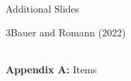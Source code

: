 \documentclass[xcolor=table,9pt,aspectratio=169]{beamer}
\begin{document}
\begin{frame}
\begin{overlayarea}{\textwidth}{0.81\paperheight}{
   \vspace*{11mm}
   \textcolor{uolblue}
   {\hspace*{1em}Additional Slides}
}
\end{overlayarea}
\end{frame}


\begin{frame}{\vspace*{10mm}3\hspace*{1em}Bauer and Romann (2022)}
\vspace*{-5mm}
\begin{center}
   \\
   {\footnotesize\textbf{Appendix A:} Items}\\
\end{center}
\end{frame}
\end{document}
